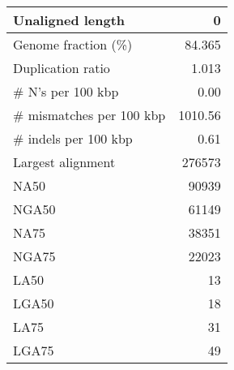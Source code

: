\documentclass[12pt,a4paper]{article}
\begin{document}
\begin{table}[ht]
\begin{center}
\begin{tabular}{|l*{1}{|r}|}
Unaligned length & 0 \\ \hline
Genome fraction (\%) & 84.365 \\ \hline
Duplication ratio & 1.013 \\ \hline
\# N's per 100 kbp & 0.00 \\ \hline
\# mismatches per 100 kbp & 1010.56 \\ \hline
\# indels per 100 kbp & 0.61 \\ \hline
Largest alignment & 276573 \\ \hline
NA50 & 90939 \\ \hline
NGA50 & 61149 \\ \hline
NA75 & 38351 \\ \hline
NGA75 & 22023 \\ \hline
LA50 & 13 \\ \hline
LGA50 & 18 \\ \hline
LA75 & 31 \\ \hline
LGA75 & 49 \\ \hline
\end{tabular}
\end{center}
\end{table}
\end{document}
